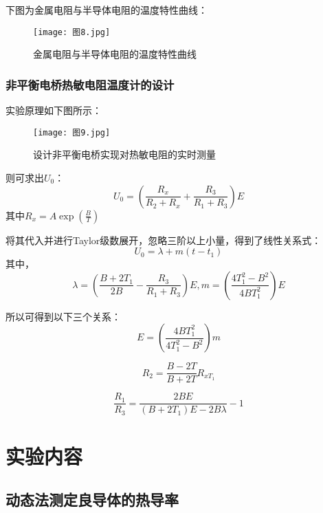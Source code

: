 \documentclass[11pt]{article}
\begin{document}
下图为金属电阻与半导体电阻的温度特性曲线：

\begin{figure}[H]
  \centering
  \texttt{[image: 图8.jpg]}
  \caption{金属电阻与半导体电阻的温度特性曲线}
\end{figure}

\subsubsection{非平衡电桥热敏电阻温度计的设计}

实验原理如下图所示：

\begin{figure}[H]
    \centering
    \texttt{[image: 图9.jpg]}
    \caption{设计非平衡电桥实现对热敏电阻的实时测量}
\end{figure}

则可求出$U_0$：\begin{displaymath}U_0=\left( \frac{R_x}{R_2+R_x}+\frac{R_3}{R_1+R_3}\right)E\end{displaymath}其中$R_x=A\exp \left(\frac{B}{T}\right)$

将其代入并进行Taylor级数展开，忽略三阶以上小量，得到了线性关系式：\begin{displaymath}U_0=\lambda+m(t-t_1)\end{displaymath}其中，\begin{displaymath}\lambda=\left(\frac{B+2T_1}{2B}-\frac{R_3}{R_1+R_3}\right)E,m=\left(\frac{4T_1^2-B^2}{4BT_1^2}\right)E\end{displaymath}

所以可得到以下三个关系：\begin{displaymath}E=\left(\frac{4BT_1^2}{4T_1^2-B^2}\right)m\end{displaymath}
  
\begin{displaymath}R_2=\frac{B-2T}{B+2T}R_{xT_1}\end{displaymath}

\begin{displaymath}\frac{R_1}{R_3}=\frac{2BE}{(B+2T_1)E-2B\lambda}-1\end{displaymath}

\section{实验内容}

\subsection{动态法测定良导体的热导率}
\end{document}

